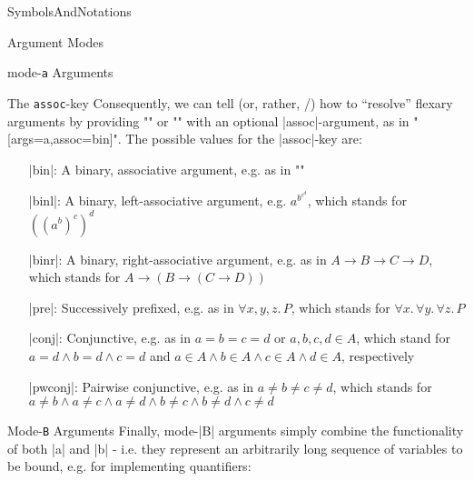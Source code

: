 \begin{smodule}[ns=https://github.com/slatex/sTeX/doc]{SymbolsAndNotations}
\begin{sfragment}{Argument Modes}
\begin{sfragment}{mode-\texttt a Arguments}
\begin{sfragment}{The \texttt{assoc}-key}
            Consequently, we can tell \sTeX (or, rather, \mmt/\omdoc)
            how to ``resolve'' flexary arguments by providing
            \stexcode"\symdecl" or \stexcode"\symdef" with
            an optional |assoc|-argument, as in
            \stexcode"[args=a,assoc=bin]".
            The possible values for the |assoc|-key are:
            \begin{itemize}
                \item[|bin|:] A binary, associative argument, e.g.
                    as in \stexcode"\addition"
                \item[|binl|:] A binary, left-associative argument, e.g.
                    $a^{\scriptstyle b^{\scriptstyle c^d}}$, which stands for $((a^b)^c)^d$
                \item[|binr|:] A binary, right-associative argument,
                    e.g. as in $A\to B\to C\to D$, which stands
                    for $A \to (B \to (C \to D))$
                \item[|pre|:] Successively prefixed, e.g. as in
                    $\forall x,y,z.\,P$, which stands for
                    $\forall x.\, \forall y.\, \forall z.\,P$
                \item[|conj|:] Conjunctive, e.g. as in
                    $a=b=c=d$ or $a,b,c,d\in A$, which stand for
                    $a=d\wedge b=d\wedge c=d$ and $a\in A\wedge b\in A
                    \wedge c\in A\wedge d\in A$, respectively
                \item[|pwconj|:] Pairwise conjunctive, e.g. as in
                    $a\neq b\neq c\neq d$, which stands for
                    $a\neq b\wedge a\neq c\wedge a\neq d\wedge b\neq c\wedge b\neq d\wedge c\neq d$
            \end{itemize}
        \end{sfragment}

    \end{sfragment}
    
    \begin{sfragment}{Mode-\texttt B Arguments}
        Finally, mode-|B| arguments simply combine the functionality
        of both |a| and |b| - i.e. they represent an arbitrarily
        long sequence of variables to be bound, e.g. for implementing
        quantifiers:

    \end{sfragment}


\end{sfragment}
\end{smodule}
